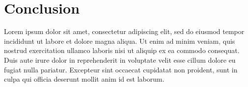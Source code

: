 \documentclass[3p,,preprint,12pt]{elsarticle}
\def\tblbottomrule{\noalign{\vspace*{6pt}}\hline\noalign{\vspace*{2pt}}}
\begin{document}
\begin{landscape}
\endgroup
\makeatletter{}\makeatother 
\end{landscape}

    
\section{Conclusion}
Lorem ipsum dolor sit amet, consectetur adipiscing elit, sed do eiusmod tempor incididunt ut labore et dolore magna aliqua. Ut enim ad minim veniam, quis nostrud exercitation ullamco laboris nisi ut aliquip ex ea commodo consequat. Duis aute irure dolor in reprehenderit in voluptate velit esse cillum dolore eu fugiat nulla pariatur. Excepteur sint occaecat cupidatat non proident, sunt in culpa qui officia deserunt mollit anim id est laborum.


    






\end{document}
